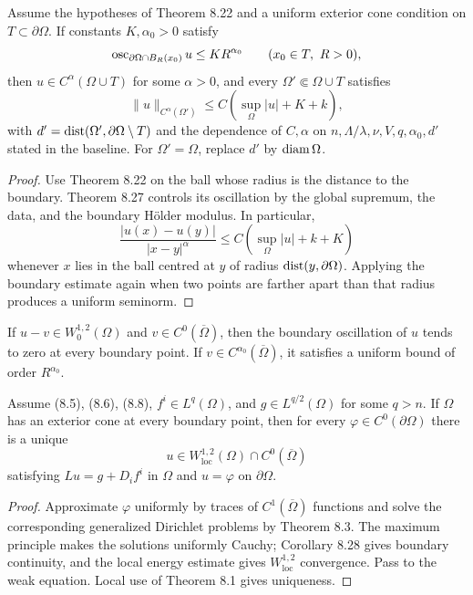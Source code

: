 \begin{theorem}
\label{gt-thm-8-29-boundary-holder}
Assume the hypotheses of Theorem 8.22 and a uniform exterior cone condition on
$T\subset\partial\Omega$. If constants $K,\alpha_0>0$ satisfy
\[
\operatorname{osc}_{\partial\Omega\cap B_R(x_0)}u\leq KR^{\alpha_0}
\qquad(x_0\in T,\ R>0),
\]
then $u\in C^\alpha(\Omega\cup T)$ for some $\alpha>0$, and every
$\Omega'\Subset\Omega\cup T$ satisfies
\begin{equation}
\|u\|_{C^\alpha(\Omega')}
\leq C(\sup_\Omega|u|+K+k),
\tag{8.73}
\end{equation}
with $d'=\operatorname{dist}(\Omega',\partial\Omega\setminus T)$ and the dependence of
$C,\alpha$ on $n,\Lambda/\lambda,\nu,V,q,\alpha_0,d'$ stated in the baseline.
For $\Omega'=\Omega$, replace $d'$ by $\operatorname{diam}\Omega$.
\end{theorem}
\begin{proof}
\sketch Use Theorem 8.22 on the ball whose radius is the distance to the boundary.
Theorem 8.27 controls its oscillation by the global supremum, the data, and the
boundary H\"older modulus. In particular,
\begin{equation}
\tag{8.74}
\frac{|u(x)-u(y)|}{|x-y|^\alpha}
\leq C(\sup_\Omega|u|+k+K)
\end{equation}
whenever $x$ lies in the ball centred at $y$ of radius
$\operatorname{dist}(y,\partial\Omega)$. Applying the boundary estimate again when two points
are farther apart than that radius produces a uniform seminorm.
\end{proof}

\begin{remark}
\label{gt-rem-8-boundary-oscillation-trace}
If $u-v\in W_0^{1,2}(\Omega)$ and $v\in C^0(\overline\Omega)$, then the boundary
oscillation of $u$ tends to zero at every boundary point. If
$v\in C^{\alpha_0}(\overline\Omega)$, it satisfies a uniform bound of order
$R^{\alpha_0}$.
\end{remark}

\begin{theorem}
\label{gt-thm-8-30-continuous-dirichlet-cone}
Assume (8.5), (8.6), (8.8), $f^i\in L^q(\Omega)$, and
$g\in L^{q/2}(\Omega)$ for some $q>n$. If $\Omega$ has an exterior cone at every
boundary point, then for every $\varphi\in C^0(\partial\Omega)$ there is a unique
\[
u\in W^{1,2}_{\mathrm{loc}}(\Omega)\cap C^0(\overline\Omega)
\]
satisfying $Lu=g+D_if^i$ in $\Omega$ and $u=\varphi$ on $\partial\Omega$.
\end{theorem}
\begin{proof}
\sketch Approximate $\varphi$ uniformly by traces of $C^1(\overline\Omega)$
functions and solve the corresponding generalized Dirichlet problems by
Theorem 8.3. The maximum principle makes the solutions uniformly Cauchy;
Corollary 8.28 gives boundary continuity, and the local energy estimate gives
$W^{1,2}_{\mathrm{loc}}$ convergence. Pass to the weak equation. Local use of
Theorem 8.1 gives uniqueness.
\end{proof}

